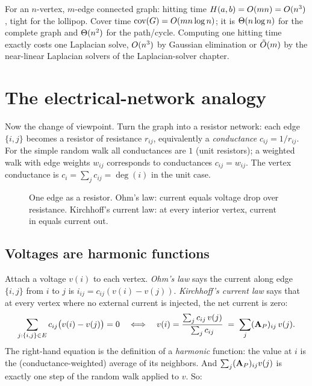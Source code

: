 \begin{complexitybox}
For an $n$-vertex, $m$-edge connected graph: hitting time $H(a,b)=O(mn)=O(n^3)$, tight for the lollipop. Cover time $\mathrm{cov}(G)=O(mn\log n)$; it is $\Theta(n\log n)$ for the complete graph and $\Theta(n^2)$ for the path/cycle. Computing one hitting time exactly costs one Laplacian solve, $O(n^3)$ by Gaussian elimination or $\tilde{O}(m)$ by the near-linear Laplacian solvers of the Laplacian-solver chapter.
\end{complexitybox}

\section{The electrical-network analogy}\label{ch35:electrical}

Now the change of viewpoint. Turn the graph into a resistor network: each edge $\{i,j\}$ becomes a resistor of resistance $r_{ij}$, equivalently a \emph{conductance} $c_{ij}=1/r_{ij}$. For the simple random walk all conductances are $1$ (unit resistors); a weighted walk with edge weights $w_{ij}$ corresponds to conductances $c_{ij}=w_{ij}$. The vertex conductance is $c_i=\sum_j c_{ij}=\deg(i)$ in the unit case.

\begin{figure}[H]
\centering
{}
\caption{One edge as a resistor. Ohm's law: current equals voltage drop over resistance. Kirchhoff's current law: at every interior vertex, current in equals current out.}
\label{ch35:fig-ohm}
\end{figure}

\subsection{Voltages are harmonic functions}

Attach a voltage $v(i)$ to each vertex. \emph{Ohm's law} says the current along edge $\{i,j\}$ from $i$ to $j$ is $i_{ij}=c_{ij}(v(i)-v(j))$. \emph{Kirchhoff's current law} says that at every vertex where no external current is injected, the net current is zero:
\[
  \sum_{j:\{i,j\}\in E} c_{ij}\big(v(i)-v(j)\big)=0
  \quad\Longleftrightarrow\quad
  v(i)=\frac{\sum_j c_{ij}\,v(j)}{\sum_j c_{ij}}
  \;=\;\sum_j (\mathbf{A}_P)_{ij}\,v(j).
\]
The right-hand equation is the definition of a \emph{harmonic} function: the value at $i$ is the (conductance-weighted) average of its neighbors. And $\sum_j(\mathbf{A}_P)_{ij}v(j)$ is exactly one step of the random walk applied to $v$. So:

